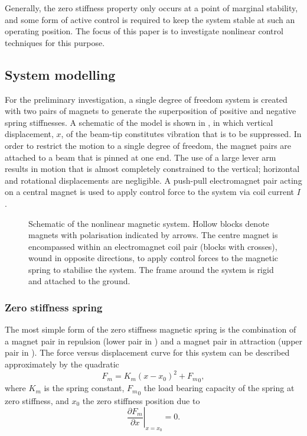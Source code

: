 Generally, the zero stiffness property only occurs at a point of
marginal stability, and some form of active control is required to
keep the system stable at such an operating position.  The focus of
this paper is to investigate nonlinear control techniques for this
purpose.

\subsection{System modelling}

For the preliminary investigation, a single degree of freedom system
is created with two pairs of magnets to generate the superposition of
positive and negative spring stiffnesses. A schematic of the model is
shown in , in which vertical displacement, $x$, of
the beam-tip constitutes vibration that is to be suppressed. In order
to restrict the motion to a single degree of freedom, the magnet pairs
are attached to a beam that is pinned at one end. The use of a large
lever arm results in motion that is almost completely constrained to
the vertical; horizontal and rotational displacements are
negligible. A push-pull electromagnet pair acting on a central magnet
is used to apply control force to the system via coil current $I$.

\begin{figure}
  \centering
  \caption{Schematic of the nonlinear magnetic system. Hollow blocks
    denote magnets with polarisation indicated by arrows. The centre
    magnet is encompassed within an electromagnet coil pair (blocks
    with crosses), wound in opposite directions, to apply control
    forces to the magnetic spring to stabilise the system. The frame
    around the system is rigid and attached to the ground.}
\end{figure}

\subsubsection{Zero stiffness spring}

The most simple form of the zero stiffness magnetic spring is the
combination of a magnet pair in repulsion (lower pair in
) and a magnet pair in attraction (upper pair in
). The force versus displacement curve for this
system can be described approximately by the quadratic~\cite{robertson2006}
\begin{equation}
  F_m = K_m(x-x_0)^2+{F_m}_0 ,
\end{equation}
where $K_m$ is the spring constant, ${F_m}_0$ the load bearing
capacity of the spring at zero stiffness, and $x_0$ the zero
stiffness position due to
\begin{equation}
  \left.\frac{\partial F_m}{\partial x}\right|_{x=x_0}=0 .
\end{equation}

